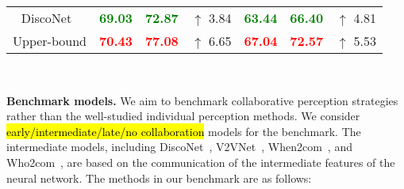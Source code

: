 \begin{figure*}[t]
\begin{minipage}{.38\linewidth}
{{\begin{tabular}{cccccccc}
        \multicolumn{2}{c}{DiscoNet~\cite{Li_2021_NeurIPS}} & \textbf{\textcolor{green}{69.03}} & \textbf{\textcolor{green}{72.87}} & $\uparrow$ 3.84 & \textbf{\textcolor{green}{63.44}} & \textbf{\textcolor{green}{66.40}} & $\uparrow$ 4.81 \\
        \multicolumn{2}{c}{Upper-bound} & \textbf{\textcolor{red}{70.43}} & \textbf{\textcolor{red}{77.08}} & $\uparrow$ 6.65 & \textbf{\textcolor{red}{67.04}} & \textbf{\textcolor{red}{72.57}} & $\uparrow$ 5.53  \\
        \bottomrule
        \end{tabular}}}
    \end{minipage}~~
\vspace{-2mm}
\end{figure*}

\textbf{Benchmark models.} We aim to benchmark collaborative perception strategies rather than the well-studied individual perception methods. We consider \hl{early/intermediate/late/no collaboration} models for the benchmark. The intermediate models, including DiscoNet~\cite{Li_2021_NeurIPS}, V2VNet~\cite{Wang2020V2VNetVC}, When2com~\cite{Liu2020When2comMP}, and Who2com~\cite{Liu2020Who2comCP}, are based on the communication of the intermediate features of the neural network. The methods in our benchmark are as follows:
